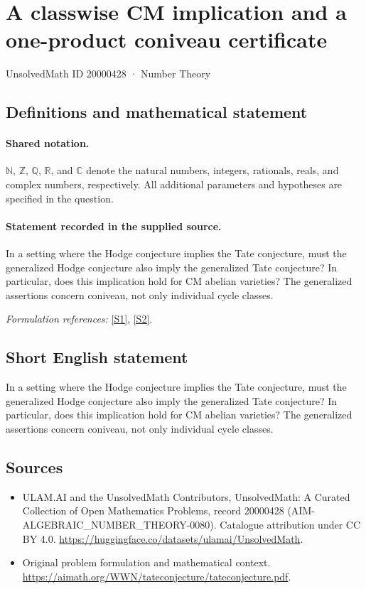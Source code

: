 \documentclass[11pt]{article}
\newcommand{\sref}[2]{\hyperlink{source:#1:#2}{[S#2]}}
\begin{document}
\setcounter{section}{20000427}
\section{A classwise CM implication and a one-product coniveau certificate}\label{20000428}
{\small UnsolvedMath ID 20000428 · Number Theory}
\subsection{Definitions and mathematical statement}

\paragraph{Shared notation.}$\mathbb N$, $\mathbb Z$, $\mathbb Q$, $\mathbb R$, and $\mathbb C$ denote the natural numbers, integers, rationals, reals, and complex numbers, respectively. All additional parameters and hypotheses are specified in the question.


\paragraph{Statement recorded in the supplied source.}
In a setting where the Hodge conjecture implies the Tate conjecture, must the generalized Hodge conjecture also imply the generalized Tate conjecture? In particular, does this implication hold for CM abelian varieties? The generalized assertions concern coniveau, not only individual cycle classes.
\par\smallskip\textit{Formulation references:} \sref{20000428}{1}, \sref{20000428}{2}.
\subsection{Short English statement}
In a setting where the Hodge conjecture implies the Tate conjecture, must the generalized Hodge conjecture also imply the generalized Tate conjecture? In particular, does this implication hold for CM abelian varieties? The generalized assertions concern coniveau, not only individual cycle classes.
\subsection{Sources}
\begin{itemize}
\item[\hypertarget{source:20000428:1}{S1}] ULAM.AI and the UnsolvedMath Contributors, UnsolvedMath: A Curated Collection of Open Mathematics Problems, record 20000428 (AIM-ALGEBRAIC\_NUMBER\_THEORY-0080). Catalogue attribution under CC BY 4.0.
\url{https://huggingface.co/datasets/ulamai/UnsolvedMath}.
\item[\hypertarget{source:20000428:2}{S2}] Original problem formulation and mathematical context.
\url{https://aimath.org/WWN/tateconjecture/tateconjecture.pdf}.
\end{itemize}
\label{end:20000428}
\end{document}

